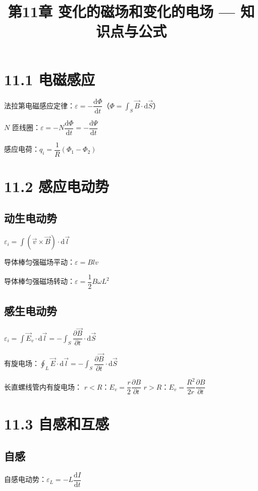 \documentclass{ctexart}
\title{\textbf{第11章 变化的磁场和变化的电场} --- 知识点与公式}
\author{}
\date{}
\begin{document}
\maketitle

\section*{11.1 电磁感应}

法拉第电磁感应定律：$\varepsilon = -\dfrac{\mathrm{d}\Phi}{\mathrm{d}t}$（$\Phi = \displaystyle\int_S \vec{B}\cdot\mathrm{d}\vec{S}$）

$N$ 匝线圈：$\varepsilon = -N\dfrac{\mathrm{d}\Phi}{\mathrm{d}t} = -\dfrac{\mathrm{d}\Psi}{\mathrm{d}t}$

感应电荷：$q_i = \dfrac{1}{R}(\Phi_1 - \Phi_2)$

\section*{11.2 感应电动势}

\subsection*{动生电动势}
$\varepsilon_i = \displaystyle\int (\vec{v}\times\vec{B})\cdot\mathrm{d}\vec{l}$

导体棒匀强磁场平动：$\varepsilon = Blv$

导体棒匀强磁场转动：$\varepsilon = \dfrac12 B\omega L^{2}$

\subsection*{感生电动势}
$\varepsilon_i = \displaystyle\int \vec{E}_v\cdot\mathrm{d}\vec{l} = -\int_S \dfrac{\partial\vec{B}}{\partial t}\cdot\mathrm{d}\vec{S}$

有旋电场：$\displaystyle\oint_L \vec{E}\cdot\mathrm{d}\vec{l} = -\int_S \dfrac{\partial\vec{B}}{\partial t}\cdot\mathrm{d}\vec{S}$

长直螺线管内有旋电场：
$r < R$：$E_v = \dfrac{r}{2}\dfrac{\partial B}{\partial t}$
$r > R$：$E_v = \dfrac{R^{2}}{2r}\dfrac{\partial B}{\partial t}$

\section*{11.3 自感和互感}

\subsection*{自感}
自感电动势：$\varepsilon_L = -L\dfrac{\mathrm{d}I}{\mathrm{d}t}$
\end{document}
